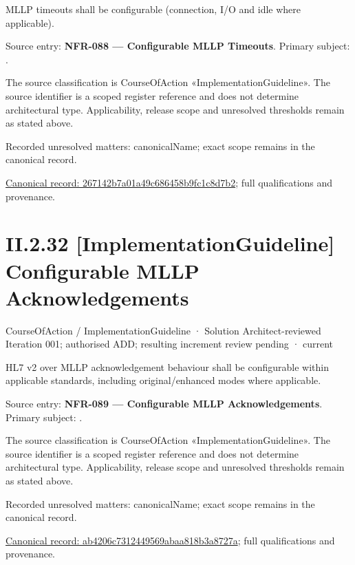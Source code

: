 MLLP timeouts shall be configurable (connection, I/O and idle where applicable).



Source entry: \textbf{NFR-088 — Configurable MLLP Timeouts}. Primary subject: \texttt{}.



The source classification is CourseOfAction «ImplementationGuideline». The source identifier is a scoped register reference and does not determine architectural type. Applicability, release scope and unresolved thresholds remain as stated above.


{\small Recorded unresolved matters: canonicalName; exact scope remains in the canonical record.}\par
{\footnotesize \href{../../../../continuum/strategy/course-of-action/implementation-guideline/267142b7a01a49c686458b9fc1c8d7b2.md}{Canonical record: 267142b7a01a49c686458b9fc1c8d7b2}; full qualifications and provenance.}\par
\section*{II.2.32 [ImplementationGuideline] Configurable MLLP Acknowledgements}
\label{navigation:II.2.32}

\label{element:ab4206c7312449569abaa818b3a8727a}
{\small CourseOfAction / ImplementationGuideline · Solution Architect-reviewed Iteration 001; authorised ADD; resulting increment review pending · current}\par

HL7 v2 over MLLP acknowledgement behaviour shall be configurable within applicable standards, including original/enhanced modes where applicable.



Source entry: \textbf{NFR-089 — Configurable MLLP Acknowledgements}. Primary subject: \texttt{}.



The source classification is CourseOfAction «ImplementationGuideline». The source identifier is a scoped register reference and does not determine architectural type. Applicability, release scope and unresolved thresholds remain as stated above.


{\small Recorded unresolved matters: canonicalName; exact scope remains in the canonical record.}\par
{\footnotesize \href{../../../../continuum/strategy/course-of-action/implementation-guideline/ab4206c7312449569abaa818b3a8727a.md}{Canonical record: ab4206c7312449569abaa818b3a8727a}; full qualifications and provenance.}\par
